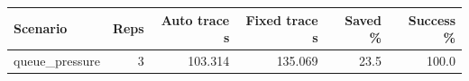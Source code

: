 \begin{tabular}{lrrrrr}
\hline
Scenario & Reps & Auto trace s & Fixed trace s & Saved \% & Success \% \\
\hline
queue_pressure & 3 & 103.314 & 135.069 & 23.5 & 100.0 \\
\hline
\end{tabular}

